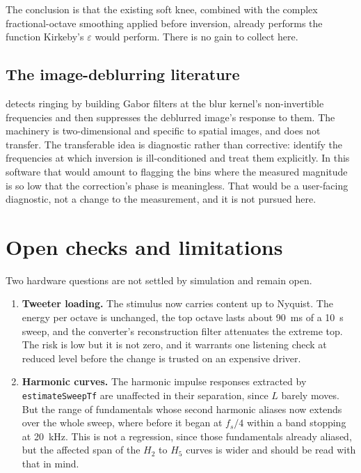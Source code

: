 \documentclass[11pt,a4paper]{article}
\newcommand{\code}[1]{\texttt{\small #1}}
\begin{document}
The conclusion is that the existing soft knee, combined with the complex
fractional-octave smoothing applied before inversion, already performs the
function Kirkeby's $\varepsilon$ would perform. There is no gain to collect here.

\subsection{The image-deblurring literature}

\cite{Mosleh2014} detects ringing by building Gabor filters at the blur kernel's
non-invertible frequencies and then suppresses the deblurred image's response to
them. The machinery is two-dimensional and specific to spatial images, and does
not transfer. The transferable idea is diagnostic rather than corrective:
identify the frequencies at which inversion is ill-conditioned and treat them
explicitly. In this software that would amount to flagging the bins where the
measured magnitude is so low that the correction's phase is meaningless. That
would be a user-facing diagnostic, not a change to the measurement, and it is
not pursued here.

\section{Open checks and limitations}

Two hardware questions are not settled by simulation and remain open.

\begin{enumerate}[leftmargin=*]
\item \textbf{Tweeter loading.} The stimulus now carries content up to Nyquist.
The energy per octave is unchanged, the top octave lasts about
\SI{90}{\milli\second} of a \SI{10}{\second} sweep, and the converter's
reconstruction filter attenuates the extreme top. The risk is low but it is not
zero, and it warrants one listening check at reduced level before the change is
trusted on an expensive driver.

\item \textbf{Harmonic curves.} The harmonic impulse responses extracted by
\code{estimateSweepTf} are unaffected in their separation, since
$L$ barely moves. But the range of fundamentals whose second harmonic aliases
now extends over the whole sweep, where before it began at $f_s/4$ within a band
stopping at \SI{20}{\kilo\hertz}. This is not a regression, since those
fundamentals already aliased, but the affected span of the $H_2$ to $H_5$ curves
is wider and should be read with that in mind.
\end{enumerate}
\end{document}
